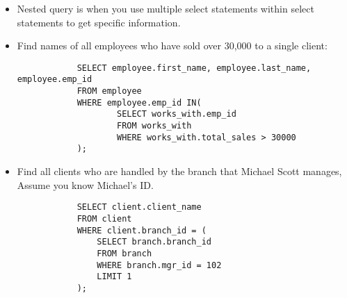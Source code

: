 \begin{itemize}
    \item Nested query is when you use multiple select statements within select statements to get specific information.
    \item Find names of all employees who have sold over 30,000 to a single client:
        \begin{verbatim}
            SELECT employee.first_name, employee.last_name, employee.emp_id
            FROM employee 
            WHERE employee.emp_id IN(
                    SELECT works_with.emp_id 
                    FROM works_with 
                    WHERE works_with.total_sales > 30000
            );
        \end{verbatim}
    
    \item Find all clients who are handled by the branch that Michael Scott manages, Assume you know Michael's ID.
        \begin{verbatim}
            SELECT client.client_name 
            FROM client 
            WHERE client.branch_id = (
                SELECT branch.branch_id 
                FROM branch 
                WHERE branch.mgr_id = 102
                LIMIT 1
            );
        \end{verbatim}
\end{itemize}
